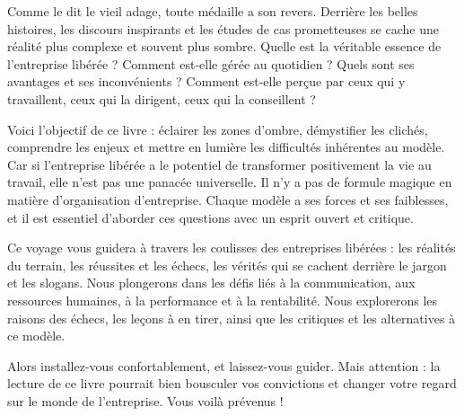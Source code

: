 Comme le dit le vieil adage, toute médaille a son revers. Derrière les belles histoires, les discours inspirants et les études de cas prometteuses se cache une réalité plus complexe et souvent plus sombre. Quelle est la véritable essence de l'entreprise libérée ? Comment est-elle gérée au quotidien ? Quels sont ses avantages et ses inconvénients ? Comment est-elle perçue par ceux qui y travaillent, ceux qui la dirigent, ceux qui la conseillent ?

Voici l'objectif de ce livre : éclairer les zones d'ombre, démystifier les clichés, comprendre les enjeux et mettre en lumière les difficultés inhérentes au modèle. Car si l'entreprise libérée a le potentiel de transformer positivement la vie au travail, elle n'est pas une panacée universelle. Il n'y a pas de formule magique en matière d'organisation d'entreprise. Chaque modèle a ses forces et ses faiblesses, et il est essentiel d'aborder ces questions avec un esprit ouvert et critique.

Ce voyage vous guidera à travers les coulisses des entreprises libérées : les réalités du terrain, les réussites et les échecs, les vérités qui se cachent derrière le jargon et les slogans. Nous plongerons dans les défis liés à la communication, aux ressources humaines, à la performance et à la rentabilité. Nous explorerons les raisons des échecs, les leçons à en tirer, ainsi que les critiques et les alternatives à ce modèle.

Alors installez-vous confortablement, et laissez-vous guider. Mais attention : la lecture de ce livre pourrait bien bousculer vos convictions et changer votre regard sur le monde de l'entreprise. Vous voilà prévenus !
